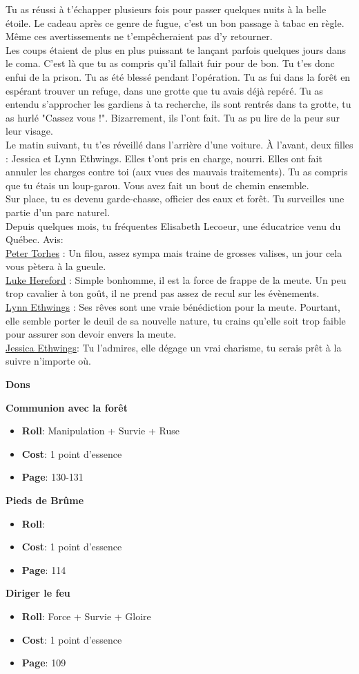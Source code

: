 \documentclass[oneside,12pt]{book}
\newcommand\don[5]{
\textbf{#1} \\
#2
\begin{itemize}
\item{ \textbf{Roll}: #3}
\item{ \textbf{Cost}: #4}
\item{ \textbf{Page}: #5}
\end{itemize}
\vspace{0.5cm}
}
\begin{document}
\begin{flushleft}
\begin{description}
{Tu as réussi à t'échapper plusieurs fois pour passer quelques nuits à la belle étoile. 
Le cadeau après ce genre de fugue, c'est un bon passage à tabac en règle. \\
Même ces avertissements ne t'empêcheraient pas d'y retourner. \\
Les coups étaient de plus en plus puissant te lançant parfois quelques jours dans le coma. 
C'est là que tu as compris qu'il fallait fuir pour de bon. Tu t'es donc enfui de la prison. 
Tu as été blessé pendant l'opération. Tu as fui dans la forêt en espérant trouver un refuge, dans une grotte que tu avais déjà repéré.
Tu as entendu s'approcher les gardiens à ta recherche, ils sont rentrés dans ta grotte, tu as hurlé "Cassez vous !". 
Bizarrement, ils l'ont fait. Tu as pu lire de la peur sur leur visage. \\
Le matin suivant, tu t'es réveillé dans l'arrière d'une voiture. À l'avant, deux filles : Jessica et Lynn Ethwings. Elles t'ont pris en charge, nourri. 
Elles ont fait annuler les charges contre toi (aux vues des mauvais traitements). Tu as compris que tu étais un loup-garou. Vous avez fait un bout de chemin ensemble. \\
Sur place, tu es devenu garde-chasse, officier des eaux et forêt. Tu surveilles une  partie d'un parc naturel. \\ 
Depuis quelques mois, tu fréquentes Elisabeth Lecoeur, une éducatrice venu du Québec. 
Avis:\\
\underline{Peter Torhes} : Un filou, assez sympa mais traine de grosses valises, un jour cela vous pètera à la gueule.\\
\underline{Luke Hereford} : Simple bonhomme, il est la force de frappe de la meute. Un peu trop cavalier à ton goût, il ne prend pas assez de recul sur les évènements.\\
\underline{Lynn Ethwings}  : Ses rêves sont une vraie bénédiction pour la meute. Pourtant, elle semble porter le deuil de sa nouvelle nature, tu crains qu'elle soit trop faible pour assurer son devoir envers la meute.\\
\underline{Jessica  Ethwings}: Tu l'admires, elle dégage un vrai charisme, tu serais prêt à la suivre n'importe où.\\
}
\end{description}
\clearpage
\textbf{\large Dons} 
\vspace{0.5cm}

\don{Communion avec la forêt}{}{Manipulation + Survie + Ruse}{1 point d'essence}{130-131}
\don{Pieds de Brûme}{}{}{1 point d'essence}{114}
\don{Diriger le feu}{}{Force + Survie + Gloire}{1 point d'essence}{109}


\end{flushleft}
\end{document}
